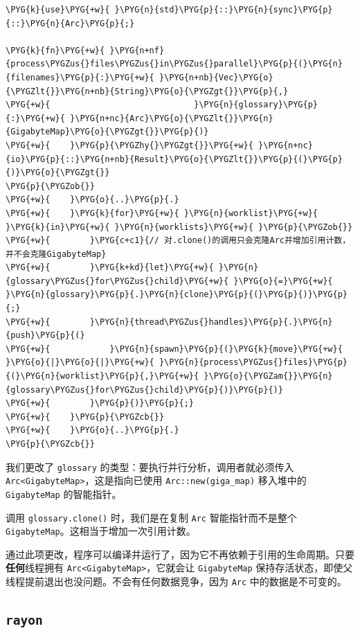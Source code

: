 \begin{Verbatim}[commandchars=\\\{\},breaklines=true,breakanywhere=true,fontsize=\codefont,xleftmargin=17bp]
\PYG{k}{use}\PYG{+w}{ }\PYG{n}{std}\PYG{p}{::}\PYG{n}{sync}\PYG{p}{::}\PYG{n}{Arc}\PYG{p}{;}

\PYG{k}{fn}\PYG{+w}{ }\PYG{n+nf}{process\PYGZus{}files\PYGZus{}in\PYGZus{}parallel}\PYG{p}{(}\PYG{n}{filenames}\PYG{p}{:}\PYG{+w}{ }\PYG{n+nb}{Vec}\PYG{o}{\PYGZlt{}}\PYG{n+nb}{String}\PYG{o}{\PYGZgt{}}\PYG{p}{,}
\PYG{+w}{                             }\PYG{n}{glossary}\PYG{p}{:}\PYG{+w}{ }\PYG{n+nc}{Arc}\PYG{o}{\PYGZlt{}}\PYG{n}{GigabyteMap}\PYG{o}{\PYGZgt{}}\PYG{p}{)}
\PYG{+w}{    }\PYG{p}{\PYGZhy{}\PYGZgt{}}\PYG{+w}{ }\PYG{n+nc}{io}\PYG{p}{::}\PYG{n+nb}{Result}\PYG{o}{\PYGZlt{}}\PYG{p}{(}\PYG{p}{)}\PYG{o}{\PYGZgt{}}
\PYG{p}{\PYGZob{}}
\PYG{+w}{    }\PYG{o}{..}\PYG{p}{.}
\PYG{+w}{    }\PYG{k}{for}\PYG{+w}{ }\PYG{n}{worklist}\PYG{+w}{ }\PYG{k}{in}\PYG{+w}{ }\PYG{n}{worklists}\PYG{+w}{ }\PYG{p}{\PYGZob{}}
\PYG{+w}{        }\PYG{c+c1}{// 对.clone()的调用只会克隆Arc并增加引用计数，并不会克隆GigabyteMap}
\PYG{+w}{        }\PYG{k+kd}{let}\PYG{+w}{ }\PYG{n}{glossary\PYGZus{}for\PYGZus{}child}\PYG{+w}{ }\PYG{o}{=}\PYG{+w}{ }\PYG{n}{glossary}\PYG{p}{.}\PYG{n}{clone}\PYG{p}{(}\PYG{p}{)}\PYG{p}{;}
\PYG{+w}{        }\PYG{n}{thread\PYGZus{}handles}\PYG{p}{.}\PYG{n}{push}\PYG{p}{(}
\PYG{+w}{            }\PYG{n}{spawn}\PYG{p}{(}\PYG{k}{move}\PYG{+w}{ }\PYG{o}{|}\PYG{o}{|}\PYG{+w}{ }\PYG{n}{process\PYGZus{}files}\PYG{p}{(}\PYG{n}{worklist}\PYG{p}{,}\PYG{+w}{ }\PYG{o}{\PYGZam{}}\PYG{n}{glossary\PYGZus{}for\PYGZus{}child}\PYG{p}{)}\PYG{p}{)}
\PYG{+w}{        }\PYG{p}{)}\PYG{p}{;}
\PYG{+w}{    }\PYG{p}{\PYGZcb{}}
\PYG{+w}{    }\PYG{o}{..}\PYG{p}{.}
\PYG{p}{\PYGZcb{}}
\end{Verbatim}

我们更改了 \texttt{glossary} 的类型：要执行并行分析，调用者就必须传入 \texttt{Arc<GigabyteMap>}，这是指向已使用 \texttt{Arc::new(giga\_map)} 移入堆中的 \texttt{GigabyteMap} 的智能指针。

调用 \texttt{glossary.clone()} 时，我们是在复制 \texttt{Arc} 智能指针而不是整个 \texttt{GigabyteMap}。这相当于增加一次引用计数。

通过此项更改，程序可以编译并运行了，因为它不再依赖于引用的生命周期。只要\textbf{任何}线程拥有 \texttt{Arc<GigabyteMap>}，它就会让 \texttt{GigabyteMap} 保持存活状态，即使父线程提前退出也没问题。不会有任何数据竞争，因为 \texttt{Arc} 中的数据是不可变的。

\subsection{\texttt{rayon}}

